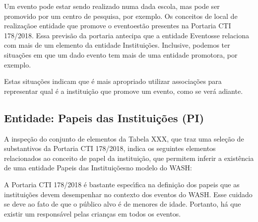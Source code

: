 \documentclass[
12pt,		%
openright,	%
twoside,  %
a4paper,			%
chapter=TITLE,		%
english,			%
french,				%
spanish,			%
brazil				%
]{USPSC-classe/USPSC}
\begin{document}
Um evento pode estar sendo realizado numa dada escola, mas pode ser promovido por um centro de pesquisa, por exemplo. Os conceitos de \textquotedbl local de realiza\c{c}\~ao\textquotedbl  e \textquotedbl entidade que promove o evento\textquotedbl  est\~ao presentes na Portaria CTI 178/2018. Essa previs\~ao da portaria antecipa que a entidade \textquotedbl Eventos\textquotedbl  se relaciona com mais de um elemento da entidade \textquotedbl Institui\c{c}\~oes\textquotedbl . Inclusive, podemos ter situa\c{c}\~oes em que um dado evento tem mais de uma entidade promotora, por exemplo.









Estas situa\c{c}\~oes indicam que \'e mais apropriado utilizar associa\c{c}\~oes para representar qual \'e a institui\c{c}\~ao que promove um evento, como se ver\'a adiante.









\subsection[Entidade: Papeis das Institui\c{c}\~oes (PI)]{Entidade: Papeis das Institui\c{c}\~oes (PI)}\label{Entidade: Papeis das Institui\c{c}\~oes (PI)}
A inspe\c{c}\~ao do conjunto de elementos da Tabela XXX, que traz uma sele\c{c}\~ao de substantivos da Portaria CTI 178/2018, indica os seguintes elementos relacionados ao conceito de \textquotedbl papel da institui\c{c}\~ao\textquotedbl , que permitem inferir a exist\^encia de uma entidade \textquotedbl Papeis das Institui\c{c}\~oes\textquotedbl  no modelo do WASH:










\noindent\begin{center}\mbox{\centering{}}\end{center}


A Portaria CTI 178/2018 \'e bastante espec\'{\i}fica na defini\c{c}\~ao dos papeis que as institui\c{c}\~oes devem desempenhar no contexto dos eventos do WASH. Esse cuidado se deve ao fato de que o p\'ublico alvo \'e de menores de idade. Portanto, h\'a que existir um respons\'avel pelas crian\c{c}as em todos os eventos.
\end{document}
